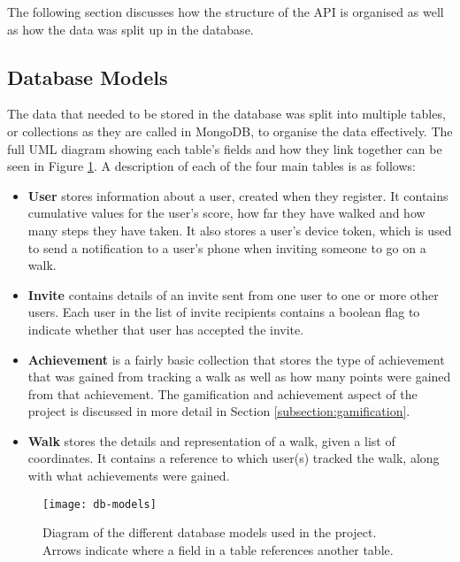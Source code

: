The following section discusses how the structure of the API is organised as well as how the data was split up in the database.


\subsection{Database Models}


The data that needed to be stored in the database was split into multiple tables, or collections as they are called in MongoDB, to organise the data effectively. The full UML diagram showing each table's fields and how they link together can be seen in Figure \ref{fig:db-models}. A description of each of the four main tables is as follows:

\begin{itemize}
  \item \textbf{User} stores information about a user, created when they register. It contains cumulative values for the user's score, how far they have walked and how many steps they have taken. It also stores a user's device token, which is used to send a notification to a user's phone when inviting someone to go on a walk.

  \item \textbf{Invite} contains details of an invite sent from one user to one or more other users. Each user in the list of invite recipients contains a boolean flag to indicate whether that user has accepted the invite.

  \item \textbf{Achievement} is a fairly basic collection that stores the type of achievement that was gained from tracking a walk as well as how many points were gained from that achievement. The gamification and achievement aspect of the project is discussed in more detail in Section \ref{subsection:gamification}.
 
  \item \textbf{Walk} stores the details and representation of a walk, given a list of coordinates. It contains a reference to which user(s) tracked the walk, along with what achievements were gained.
\end{itemize}


\begin{figure}[hbt]
  \centering
  \texttt{[image: db-models]}
  \caption{Diagram of the different database models used in the project. Arrows indicate where a field in a table references another table.}
  \label{fig:db-models}
\end{figure}

